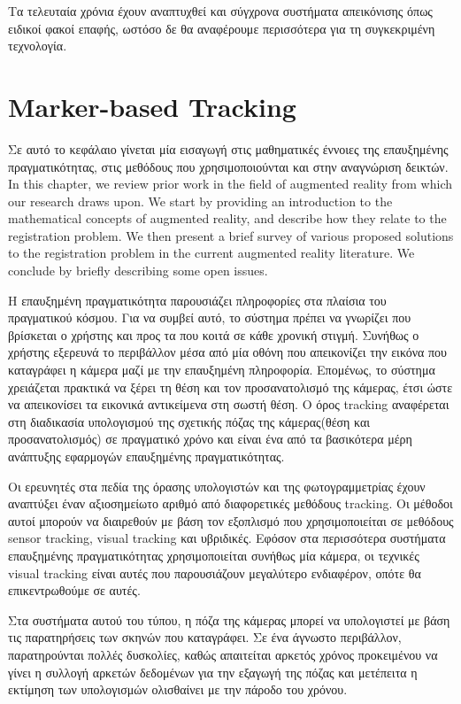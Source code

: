 Τα τελευταία χρόνια έχουν αναπτυχθεί και σύγχρονα συστήματα απεικόνισης όπως ειδικοί φακοί επαφής, ωστόσο δε θα αναφέρουμε περισσότερα για τη συγκεκριμένη τεχνολογία.





\section{Marker-based Tracking}

Σε αυτό το κεφάλαιο γίνεται μία εισαγωγή στις μαθηματικές έννοιες της επαυξημένης πραγματικότητας, στις μεθόδους που χρησιμοποιούνται και στην αναγνώριση δεικτών.  
In this chapter, we review prior work in the field of augmented reality from which our research draws upon. We start by providing an introduction to the mathematical concepts of augmented reality, and describe how they relate to the registration problem. We then present a brief survey of various proposed solutions to the registration problem in the current augmented reality literature. We conclude by briefly describing some open issues.

Η επαυξημένη πραγματικότητα παρουσιάζει πληροφορίες στα πλαίσια του πραγματικού κόσμου. Για να συμβεί αυτό, το σύστημα πρέπει να γνωρίζει που βρίσκεται ο χρήστης και προς τα που κοιτά σε κάθε χρονική στιγμή. Συνήθως ο χρήστης εξερευνά το περιβάλλον μέσα από μία οθόνη που απεικονίζει την εικόνα που καταγράφει η κάμερα μαζί με την επαυξημένη πληροφορία.  
Επομένως, το σύστημα χρειάζεται πρακτικά να ξέρει τη θέση και τον προσανατολισμό της κάμερας, έτσι ώστε να απεικονίσει τα εικονικά αντικείμενα στη σωστή θέση. Ο όρος tracking αναφέρεται στη διαδικασία υπολογισμού της σχετικής πόζας της κάμερας(θέση και προσανατολισμός) σε πραγματικό χρόνο και είναι ένα από τα βασικότερα μέρη ανάπτυξης εφαρμογών επαυξημένης πραγματικότητας.


Οι ερευνητές στα πεδία της όρασης υπολογιστών και της φωτογραμμετρίας έχουν αναπτύξει έναν αξιοσημείωτο αριθμό από διαφορετικές μεθόδους tracking. Οι μέθοδοι αυτοί μπορούν να διαιρεθούν με βάση τον εξοπλισμό που χρησιμοποιείται σε μεθόδους sensor tracking, visual tracking και υβριδικές.  Εφόσον στα περισσότερα συστήματα επαυξημένης πραγματικότητας χρησιμοποιείται συνήθως μία κάμερα, οι τεχνικές visual tracking είναι αυτές που παρουσιάζουν μεγαλύτερο ενδιαφέρον, οπότε θα επικεντρωθούμε σε αυτές.


Στα συστήματα αυτού του τύπου, η πόζα της κάμερας μπορεί να υπολογιστεί με βάση τις παρατηρήσεις των σκηνών που καταγράφει. Σε ένα άγνωστο περιβάλλον, παρατηρούνται πολλές δυσκολίες, καθώς απαιτείται αρκετός χρόνος προκειμένου να γίνει η συλλογή αρκετών δεδομένων για την εξαγωγή της πόζας και μετέπειτα η εκτίμηση των υπολογισμών ολισθαίνει με την πάροδο του χρόνου. 


